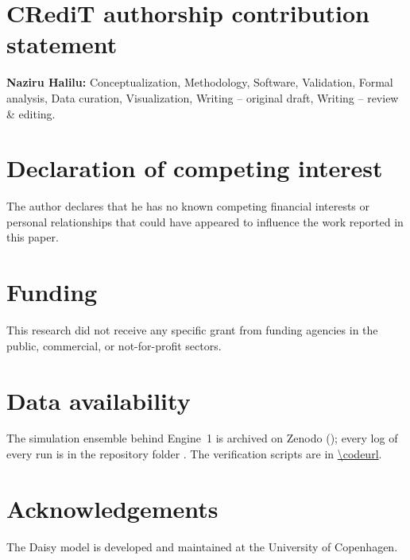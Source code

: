 \documentclass[preprint,12pt]{elsarticle}
\begin{document}
\section*{CRediT authorship contribution statement}
\textbf{Naziru Halilu:} Conceptualization, Methodology, Software, Validation, Formal analysis, Data curation, Visualization, Writing -- original draft, Writing -- review \& editing.

\section*{Declaration of competing interest}
The author declares that he has no known competing financial interests or personal relationships that could have appeared to influence the work reported in this paper.

\section*{Funding}
This research did not receive any specific grant from funding agencies in the public, commercial, or not-for-profit sectors.

\section*{Data availability}
The simulation ensemble behind Engine~1 is archived on Zenodo (); every log of every run is in the repository folder \cslink{}. The verification scripts are in \url{\codeurl}.

\section*{Acknowledgements}
The Daisy model is developed and maintained at the University of Copenhagen.



\end{document}

